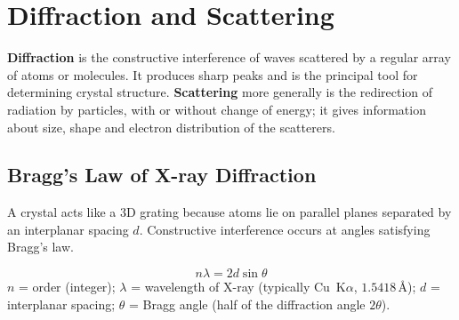 \documentclass[12pt,a4paper]{article}
\begin{document}
\section{Diffraction and Scattering}

\begin{tcolorbox}[defbox]
\textbf{Diffraction} is the constructive interference of waves scattered by a regular array of atoms or molecules. It produces sharp peaks and is the principal tool for determining crystal structure. \textbf{Scattering} more generally is the redirection of radiation by particles, with or without change of energy; it gives information about size, shape and electron distribution of the scatterers.
\end{tcolorbox}

\subsection{Bragg's Law of X-ray Diffraction}
A crystal acts like a 3D grating because atoms lie on parallel planes separated by an interplanar spacing $d$. Constructive interference occurs at angles satisfying Bragg's law.

\begin{tcolorbox}[formulabox, title={Bragg's Law}]
\[
n\lambda = 2d\sin\theta
\]
$n$ = order (integer); $\lambda$ = wavelength of X-ray (typically Cu~K$\alpha$, $1.5418\,\text{\AA}$); $d$ = interplanar spacing; $\theta$ = Bragg angle (half of the diffraction angle $2\theta$).
\end{tcolorbox}

\begin{tcolorbox}[tikzbox, title={Bragg Reflection from Two Lattice Planes}]
\centering
{}
\end{tcolorbox}
\end{document}
